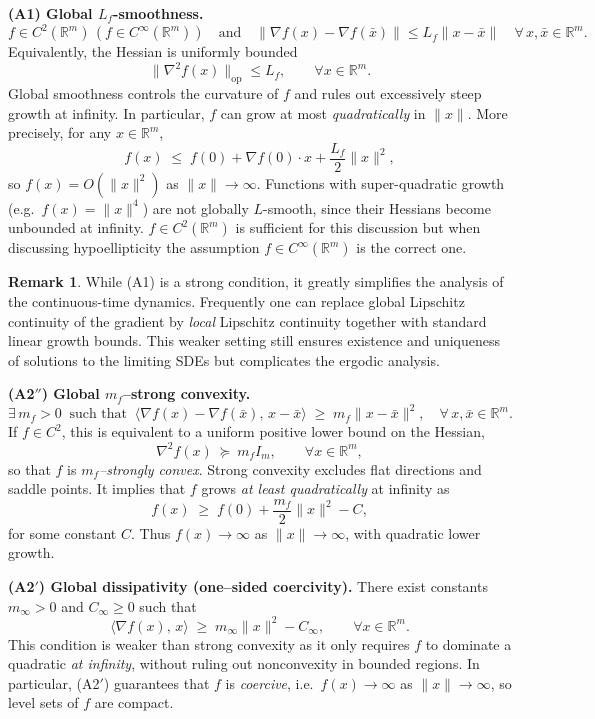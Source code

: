 \documentclass[11pt, a4paper,leqno]{amsart}
\theoremstyle{definition}
\newtheorem{remark}{Remark}[section]
\numberwithin{equation}{section}
\newcommand{\R}{\mathbb R}
\begin{document}
\medskip
\noindent\textbf{(A1) Global $L_f$-smoothness.}
\begin{equation*}
f \in C^2(\R^m)\, (f \in C^\infty(\R^m))
\quad\text{and}\quad
\|\nabla f(x)-\nabla f(\bar x)\| \le L_f \|x-\bar x\|
\quad \forall\, x,\bar x \in \R^m.
\end{equation*}
Equivalently, the Hessian is uniformly bounded
\[
\|\nabla^2 f(x)\|_{\mathrm{op}} \le L_f, \qquad \forall x \in \R^m.
\]
Global smoothness controls the curvature of $f$ and rules out excessively steep growth at infinity. In particular,  $f$ can grow at most \emph{quadratically} in $\|x\|$. More precisely, for any $x \in \R^m$,
\[
f(x) \;\le\; f(0) + \nabla f(0)\cdot x + \frac{L_f}{2}\|x\|^2,
\]
so $f(x) = O(\|x\|^2)$ as $\|x\|\to\infty$. Functions with super-quadratic growth (e.g.\ $f(x) = \|x\|^4$) are not globally $L$-smooth, since their Hessians become unbounded at infinity. $f \in C^2(\R^m)$ is sufficient for this discussion but when discussing hypoellipticity the assumption  $f \in C^\infty(\R^m)$ is the correct one.

\begin{remark}
While (A1) is a strong condition, it greatly simplifies the analysis of the continuous-time dynamics. Frequently one can replace global Lipschitz continuity of the gradient by \emph{local} Lipschitz continuity together with standard linear growth bounds. This weaker setting still ensures existence and uniqueness of solutions to the limiting SDEs but complicates the ergodic analysis.
\end{remark}


\noindent\textbf{(A2$''$) Global $m_f$–strong convexity.}
\begin{equation}\label{eq:dissipativity-}
\exists\, m_f>0 \ \text{ such that }\
\langle \nabla f(x)-\nabla f(\bar x),\,x-\bar x\rangle
\;\ge\; m_f \|x-\bar x\|^2,
\quad \forall\, x,\bar x\in\R^m.
\end{equation}
If $f\in C^2$, this is equivalent to a uniform positive lower bound on the Hessian,
\[
\nabla^2 f(x) \ \succeq\ m_f I_m, \qquad \forall x\in\R^m,
\]
so that $f$ is \emph{$m_f$–strongly convex}.
Strong convexity excludes flat directions and saddle points. It implies that $f$ grows \emph{at least quadratically} at infinity as
\[
f(x) \;\ge\; f(0) + \frac{m_f}{2}\|x\|^2 - C,
\]
for some constant $C$. Thus $f(x)\to\infty$ as $\|x\|\to\infty$, with quadratic lower growth.

\smallskip
\noindent\textbf{(A2$'$) Global dissipativity (one–sided coercivity).}
There exist constants $m_\infty>0$ and $C_\infty\ge 0$ such that
\begin{equation}\label{eq:dissipativity}
\langle \nabla f(x),\,x\rangle
\;\ge\; m_\infty \|x\|^2 - C_\infty,
\qquad \forall x\in\R^m.
\end{equation}
This condition is weaker than strong convexity as it only requires $f$ to dominate a quadratic \emph{at infinity}, without ruling out nonconvexity in bounded regions.
In particular, (A2$'$) guarantees that $f$ is \emph{coercive}, i.e.\ $f(x)\to\infty$ as $\|x\|\to\infty$, so level sets of $f$ are compact.
\end{document}
